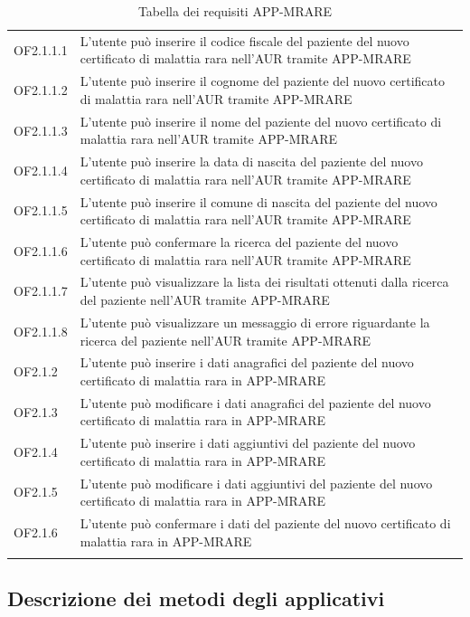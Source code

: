 \documentclass[a4paper]{article}
\begin{document}
\begin{longtable}{|l|p{10cm}|}
OF2.1.1.1 & L'utente può inserire il codice fiscale del paziente del nuovo certificato di malattia rara nell'AUR tramite APP-MRARE \\
OF2.1.1.2 & L'utente può inserire il cognome del paziente del nuovo certificato di malattia rara nell'AUR tramite APP-MRARE \\
OF2.1.1.3 & L'utente può inserire il nome del paziente del nuovo certificato di malattia rara nell'AUR tramite APP-MRARE \\
OF2.1.1.4 & L'utente può inserire la data di nascita del paziente del nuovo certificato di malattia rara nell'AUR tramite APP-MRARE \\
OF2.1.1.5 & L'utente può inserire il comune di nascita del paziente del nuovo certificato di malattia rara nell'AUR tramite APP-MRARE \\
OF2.1.1.6 & L'utente può confermare la ricerca del paziente del nuovo certificato di malattia rara nell'AUR tramite APP-MRARE \\
OF2.1.1.7 & L'utente può visualizzare la lista dei risultati ottenuti dalla ricerca del paziente nell'AUR tramite APP-MRARE \\
OF2.1.1.8 & L'utente può visualizzare un messaggio di errore riguardante la ricerca del paziente nell'AUR tramite APP-MRARE \\

OF2.1.2 & L'utente può inserire i dati anagrafici del paziente del nuovo certificato di malattia rara in APP-MRARE \\
OF2.1.3 & L'utente può modificare i dati anagrafici del paziente del nuovo certificato di malattia rara in APP-MRARE \\
OF2.1.4 & L'utente può inserire i dati aggiuntivi del paziente del nuovo certificato di malattia rara in APP-MRARE \\
OF2.1.5 & L'utente può modificare i dati aggiuntivi del paziente del nuovo certificato di malattia rara in APP-MRARE \\
OF2.1.6 & L'utente può confermare i dati del paziente del nuovo certificato di malattia rara in APP-MRARE \\

\hline
\caption{Tabella dei requisiti APP-MRARE} \\
\end{longtable}

\newpage

\subsection{Descrizione dei metodi degli applicativi}
\end{document}

